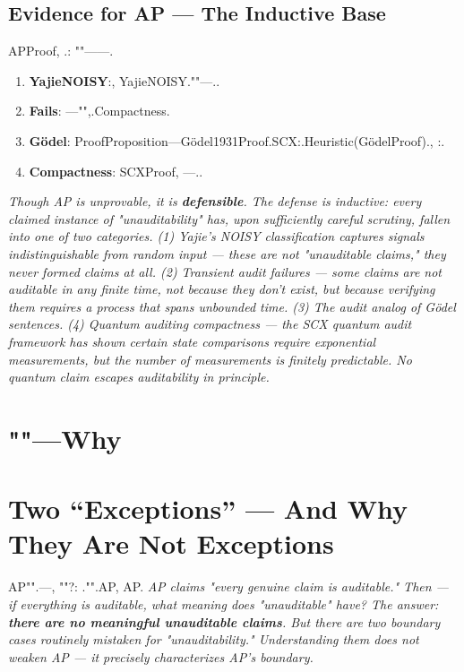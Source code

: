 \documentclass[12pt,a4paper]{article}
\theoremstyle{plain}
\theoremstyle{definition}
\theoremstyle{remark}
\begin{document}
\subsection{Evidence for AP --- The Inductive Base}
APProof, .: ""------.
\begin{enumerate}[label=(\arabic*)]
 \item \textbf{YajieNOISY}:, YajieNOISY.""---\textit{}..
 \item \textbf{Fails}: ---"",.Compactness.
 \item \textbf{G\"odel}: ProofProposition---G\"odel1931Proof.SCX:.Heuristic(G\"odelProof)., :.
 \item \textbf{Compactness}: SCXProof, ---..
\end{enumerate}
\vspace{4pt}
\noindent
\textit{Though AP is unprovable, it is \textbf{defensible}. The defense is inductive: every claimed instance of "unauditability" has, upon sufficiently careful scrutiny, fallen into one of two categories. (1) Yajie's NOISY classification captures signals indistinguishable from random input --- these are not "unauditable claims," they never formed claims at all. (2) Transient audit failures --- some claims are not auditable in any finite time, not because they don't exist, but because verifying them requires a process that spans unbounded time. (3) The audit analog of G\"odel sentences. (4) Quantum auditing compactness --- the SCX quantum audit framework has shown certain state comparisons require exponential measurements, but the number of measurements is finitely predictable. No quantum claim escapes auditability in principle.}
\newpage
\section{""---Why}
\section{Two ``Exceptions'' --- And Why They Are Not Exceptions}
AP"".---, ""?: ."".AP, AP.
\vspace{4pt}
\noindent
\textit{AP claims "every genuine claim is auditable." Then --- if everything is auditable, what meaning does "unauditable" have? The answer: \textbf{there are no meaningful unauditable claims}. But there are two boundary cases routinely mistaken for "unauditability." Understanding them does not weaken AP --- it precisely characterizes AP's boundary.}
\end{document}
